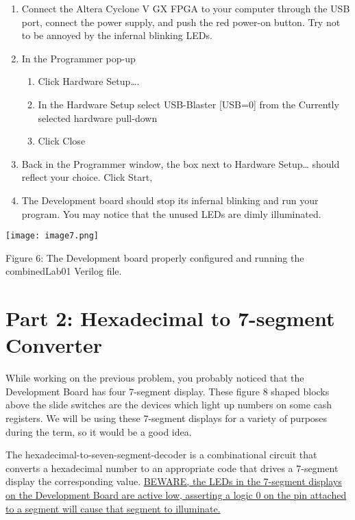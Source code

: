 \begin{enumerate}
\def\labelenumi{\arabic{enumi}.}
\setcounter{enumi}{14}
\item
  Connect the Altera Cyclone V GX FPGA to your computer through the USB
  port, connect the power supply, and push the red power-on button. Try
  not to be annoyed by the infernal blinking LEDs.
\item
  In the Programmer pop-up

  \begin{enumerate}
  \def\labelenumii{\alph{enumii}.}
  \item
    Click Hardware Setup\ldots.
  \item
    In the Hardware Setup select USB-Blaster {[}USB=0{]} from the
    Currently selected hardware pull-down
  \item
    Click Close
  \end{enumerate}
\item
  Back in the Programmer window, the box next to Hardware Setup\ldots{}
  should reflect your choice. Click Start,
\item
  The Development board should stop its infernal blinking and run your
  program. You may notice that the unused LEDs are dimly illuminated.
\end{enumerate}

\texttt{[image: image7.png]}

Figure 6: The Development board properly configured and running the
combinedLab01 Verilog file.

\hypertarget{part-2-hexadecimal-to-7-segment-converter}{%
\section{Part 2: Hexadecimal to 7-segment
Converter}\label{part-2-hexadecimal-to-7-segment-converter}}

While working on the previous problem, you probably noticed that the
Development Board has four 7-segment display. These figure 8 shaped
blocks above the slide switches are the devices which light up numbers
on some cash registers. We will be using these 7-segment displays for a
variety of purposes during the term, so it would be a good idea.

The hexadecimal-to-seven-segment-decoder is a combinational circuit that
converts a hexadecimal number to an appropriate code that drives a
7-segment display the corresponding value. \uline{BEWARE, the LEDs in
the 7-segment displays on the Development Board are active low,
asserting a logic 0 on the pin attached to a segment will cause that
segment to illuminate.}

